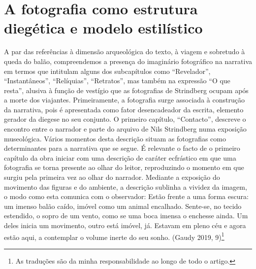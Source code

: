 \documentclass{article}
\begin{document}
\section{A fotografia como estrutura diegética e modelo estilístico}
A par das referências à dimensão arqueológica do texto, à viagem e sobretudo à
queda do balão, compreendemos a presença do imaginário fotográfico na narrativa
em termos que intitulam alguns dos subcapítulos como “Revelador”, “Instantâneos”,
“Relíquias”, “Retratos”, mas também na expressão “O que resta”, alusiva à função de
vestígio que as fotografias de Strindberg ocupam após a morte dos viajantes. Primeiramente, a fotografia surge associada à construção da narrativa, pois é apresentada
como fator desencadeador da escrita, elemento gerador da diegese no seu conjunto.
O primeiro capítulo, “Contacto”, descreve o encontro entre o narrador e parte do arquivo de Nils Strindberg numa exposição museológica. Vários momentos desta descrição situam as fotografias como determinantes para a narrativa que se segue. É
relevante o facto de o primeiro capítulo da obra iniciar com uma descrição de caráter
ecfrástico em que uma fotografia se torna presente ao olhar do leitor, reproduzindo
o momento em que surgiu pela primeira vez ao olhar do narrador. Mediante a exposição do movimento das figuras e do ambiente, a descrição sublinha a vividez da
imagem, o modo como esta comunica com o observador:
Estão frente a uma forma escura: um imenso balão caído, imóvel como um animal
encalhado. Sente-se, no tecido estendido, o sopro de um vento, como se uma boca
imensa o enchesse ainda. Um deles inicia um movimento, outro está imóvel, já.
Estavam em pleno céu e agora estão aqui, a contemplar o volume inerte do seu
sonho. (Gaudy 2019, 9)\footnote{As traduções são da minha responsabilidade ao longo de todo o artigo.}
\end{document}
